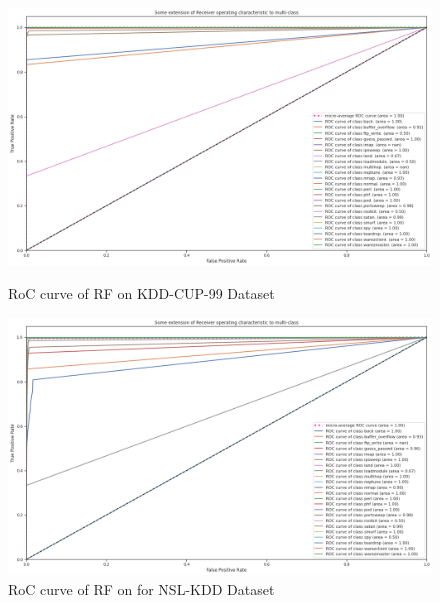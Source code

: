 \documentclass[conference]{IEEEtran}
\begin{document}
\clearpage
\begin{figure}[h]
  \centering
  \includegraphics[width=18cm]{RF_KDD.png}
  \caption{RoC curve of RF on KDD-CUP-99 Dataset}
  \label{RF_KDD}

  \vspace*{\floatsep}%

  \includegraphics[width=18cm]{RF_NSL.png}
  \caption{RoC curve of RF on for NSL-KDD Dataset}
  \label{Rf_NSL}
  
\end{figure}
\end{document}

